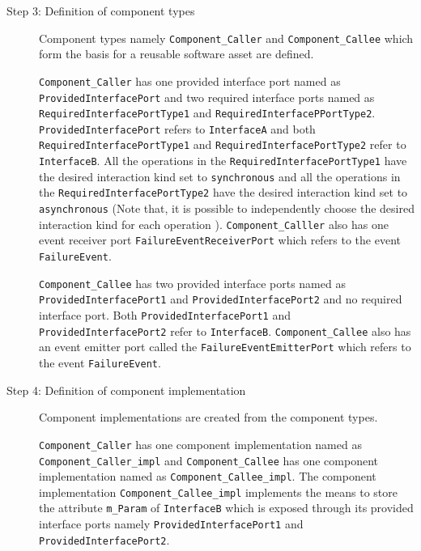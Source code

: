\begin{description}
\item [Step 3: Definition of component types] Component types namely \texttt{Component\allowbreak\_Caller} and \texttt{Component\allowbreak\_Callee} which form the basis for a reusable software asset are defined. 

\texttt{Component\allowbreak\_Caller} has one provided interface port named as \texttt{ProvidedInterface\allowbreak Port} and two required interface ports named as \texttt{RequiredInterface\allowbreak PortType1} and \texttt{RequiredInterfaceP\allowbreak PortType2}. \texttt{ProvidedInterface\allowbreak Port} refers to \texttt{InterfaceA} and both \texttt{RequiredInterface\allowbreak PortType1} and \texttt{RequiredInterface\allowbreak PortType2} refer to \texttt{InterfaceB}. All the operations in the \texttt{RequiredInterface\allowbreak PortType1} have the desired interaction kind set to \texttt{synchronous} and all the operations in the \texttt{RequiredInterface\allowbreak PortType2} have the desired interaction kind set to \texttt{asynchronous} (Note that, it is possible to independently choose the desired interaction kind for each operation \cite{SpecMetamodel}). \texttt{Component\allowbreak\_Calller} also has one event receiver port \texttt{FailureEvent\allowbreak ReceiverPort} which refers to the event \texttt{FailureEvent}.

\texttt{Component\_Callee} has two provided interface ports named as \texttt{ProvidedInterface\allowbreak Port1} and \texttt{ProvidedInterface\allowbreak Port2} and no required interface port. Both \texttt{ProvidedInterface\allowbreak Port1} and \texttt{ProvidedInterface\allowbreak Port2} refer to \texttt{InterfaceB}. \texttt{Component\allowbreak\_Callee} also has an event emitter port called the \texttt{FailureEvent\allowbreak EmitterPort} which refers to the event \texttt{FailureEvent}.

\item [Step 4: Definition of component implementation] Component implementations are created from the component types.

\texttt{Component\allowbreak\_Caller} has one component implementation named as \texttt{Component\allowbreak\_Caller\_impl} and \texttt{Component\allowbreak\_Callee} has one component implementation named as \texttt{Component\allowbreak\_Callee\_impl}. The component implementation \texttt{Component\allowbreak\_Callee\_impl} implements the means to store the attribute \texttt{m\_Param} of \texttt{InterfaceB} which is exposed through its provided interface ports namely \texttt{ProvidedInterface\allowbreak Port1} and \texttt{ProvidedInterface\allowbreak Port2}.


\end{description}
